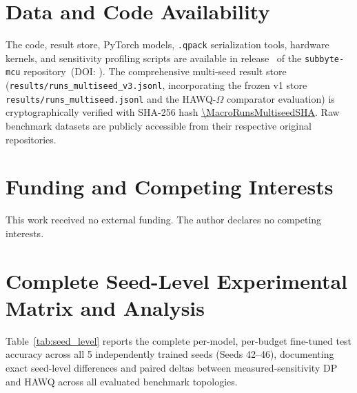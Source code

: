 \documentclass{ieeeaccess}
\begin{document}
\section*{Data and Code Availability}
The code, result store, PyTorch models, \texttt{.qpack} serialization tools, hardware kernels, and sensitivity profiling scripts are available in release \MacroRepositoryRelease\ of the \texttt{subbyte-mcu} repository\ifx\archivedoi\empty\else\ (DOI: \archivedoi)\fi. The comprehensive multi-seed result store (\texttt{results/\allowbreak runs\_multiseed\_v3.\allowbreak jsonl}, incorporating the frozen v1 store \texttt{results/\allowbreak runs\_multiseed.\allowbreak jsonl} and the HAWQ-$\Omega$ comparator evaluation) is cryptographically verified with SHA-256 hash \expandafter\url\expandafter{\MacroRunsMultiseedSHA}. Raw benchmark datasets are publicly accessible from their respective original repositories.

\section*{Funding and Competing Interests}
This work received no external funding. The author declares no competing interests.





\appendices
\section{Complete Seed-Level Experimental Matrix and Analysis}
\label{sec:appendix_seed_level}

Table~\ref{tab:seed_level} reports the complete per-model, per-budget fine-tuned test accuracy across all 5 independently trained seeds (Seeds 42--46), documenting exact seed-level differences and paired deltas between measured-sensitivity DP and HAWQ across all evaluated benchmark topologies.
\end{document}
